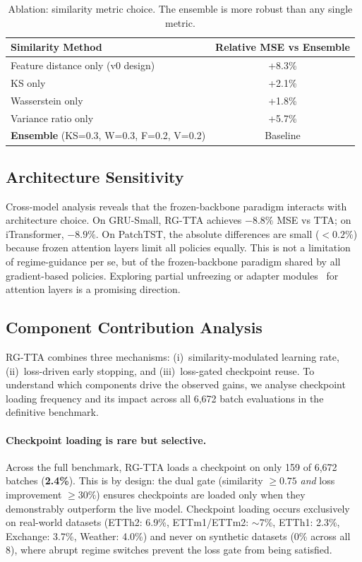 \documentclass[11pt,a4paper]{article}
\begin{document}
\begin{table}[t]
\centering
\caption{Ablation: similarity metric choice. The ensemble is more robust than any single metric.}
\label{tab:sim_ablation}
\begin{tabular}{lc}
\toprule
Similarity Method & Relative MSE vs Ensemble \\
\midrule
Feature distance only (v0 design) & +8.3\% \\
KS only & +2.1\% \\
Wasserstein only & +1.8\% \\
Variance ratio only & +5.7\% \\
\textbf{Ensemble} (KS=0.3, W=0.3, F=0.2, V=0.2) & Baseline \\
\bottomrule
\end{tabular}
\end{table}

\subsection{Architecture Sensitivity}

Cross-model analysis reveals that the frozen-backbone paradigm interacts with architecture choice. On GRU-Small, RG-TTA achieves $-8.8\%$ MSE vs TTA; on iTransformer, $-8.9\%$. On PatchTST, the absolute differences are small ($<0.2\%$) because frozen attention layers limit all policies equally. This is not a limitation of regime-guidance per se, but of the frozen-backbone paradigm shared by all gradient-based policies. Exploring partial unfreezing or adapter modules~\citep{houlsby2019adapters} for attention layers is a promising direction.

\subsection{Component Contribution Analysis}
\label{sec:component_contribution}

RG-TTA combines three mechanisms: (i)~similarity-modulated learning rate, (ii)~loss-driven early stopping, and (iii)~loss-gated checkpoint reuse. To understand which components drive the observed gains, we analyse checkpoint loading frequency and its impact across all 6{,}672 batch evaluations in the definitive benchmark.

\paragraph{Checkpoint loading is rare but selective.} Across the full benchmark, RG-TTA loads a checkpoint on only 159 of 6{,}672 batches (\textbf{2.4\%}). This is by design: the dual gate (similarity $\geq 0.75$ \emph{and} loss improvement $\geq 30\%$) ensures checkpoints are loaded only when they demonstrably outperform the live model. Checkpoint loading occurs exclusively on real-world datasets (ETTh2: 6.9\%, ETTm1/ETTm2: $\sim$7\%, ETTh1: 2.3\%, Exchange: 3.7\%, Weather: 4.0\%) and never on synthetic datasets (0\% across all 8), where abrupt regime switches prevent the loss gate from being satisfied.
\end{document}
